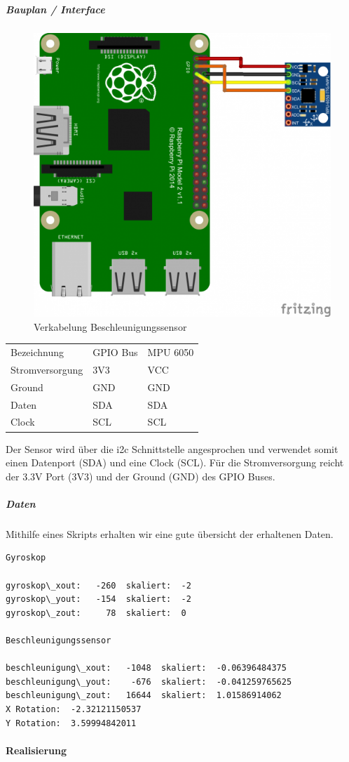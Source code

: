 \documentclass[../../main.tex]{subfiles}
\begin{document}
\subparagraph{Bauplan / Interface}
\begin{figure}[H] \centering
  \includegraphics{Verkabelung_BeschlSensor}
  \caption{Verkabelung Beschleunigungssensor}
  \label{fig:Beschleunigungssensor}
\end{figure}

\begin{table}[] \centering
\begin{tabular}{lll}
Bezeichnung     & GPIO Bus & MPU 6050 \\
Stromversorgung & 3V3      & VCC      \\
Ground          & GND      & GND      \\
Daten          & SDA      & SDA      \\
Clock          & SCL      & SCL
\end{tabular}
\end{table}

Der Sensor wird über die i2c Schnittstelle angesprochen und verwendet somit einen Datenport (SDA) und eine Clock (SCL). Für die Stromversorgung reicht der 3.3V Port (3V3) und der Ground (GND) des GPIO Buses.

\subparagraph{Daten}
Mithilfe eines Skripts erhalten wir eine gute übersicht der erhaltenen Daten.

\begin{lstlisting}
Gyroskop

gyroskop\_xout:   -260  skaliert:  -2
gyroskop\_yout:   -154  skaliert:  -2
gyroskop\_zout:     78  skaliert:  0

Beschleunigungssensor

beschleunigung\_xout:   -1048  skaliert:  -0.06396484375
beschleunigung\_yout:    -676  skaliert:  -0.041259765625
beschleunigung\_zout:   16644  skaliert:  1.01586914062
X Rotation:  -2.32121150537
Y Rotation:  3.59994842011
\end{lstlisting}

\paragraph{Realisierung}
\end{document}
